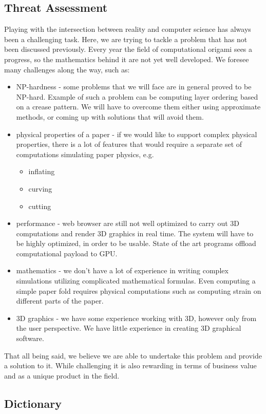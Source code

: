 \subsection{Threat Assessment}

Playing with the intersection between reality and computer science has always
been a challenging task.
Here, we are trying to tackle a problem that has not been discussed previously.
Every year the field of computational origami sees a progress,
so the mathematics behind it are not yet well developed.
We foresee many challenges along the way, such as:

\begin{itemize}
	\item NP-hardness - some problems that we will face are in general proved to be NP-hard.
		Example of such a problem can be computing layer ordering based on a crease pattern.
		We will have to overcome them either using approximate methods, or coming up with solutions that will avoid them.

	\item physical properties of a paper - if we would like to support complex physical properties,
		there is a lot of features that would require a separate set of computations simulating paper physics, e.g.
		\begin{itemize}
			\item inflating
			\item curving 
			\item cutting
		\end{itemize}

	\item performance - web browser are still not well optimized to carry out 3D computations and render 3D graphics in real time.
		The system will have to be highly optimized, in order to be usable.
		State of the art programs offload computational payload to GPU.

	\item mathematics - we don't have a lot of experience in writing complex simulations utilizing complicated mathematical formulas.
		Even computing a simple paper fold requires physical computations such as computing strain on different parts of the paper.

	\item 3D graphics - we have some experience working with 3D, however only from the user perspective.
		We have little experience in creating 3D graphical software.

\end{itemize}

That all being said, we believe we are able to undertake this problem and provide a solution to it.
While challenging it is also rewarding in terms of business value and as a unique product in the field.


\subsection{Dictionary} \label{dictionary}



